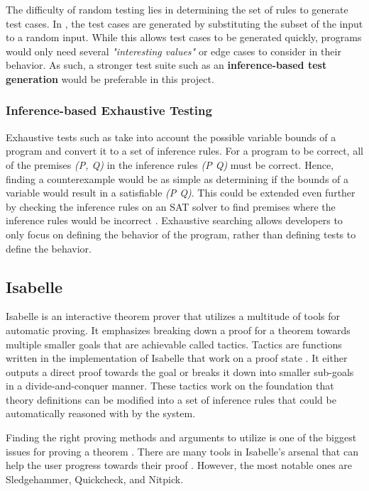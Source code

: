 The difficulty of random testing lies in determining the set of rules to generate test cases. In \cite{differentialTesting}, the test cases 
are generated by substituting the subset of the input to a random input. While this allows test cases to be generated quickly, programs would only 
need several \emph{"interesting values"} or edge cases to consider in their behavior. As such, a stronger test suite such as an 
\textbf{inference-based test generation} would be preferable in this project.

\subsubsection{Inference-based Exhaustive Testing}
\label{sec:inferenceTesting}

Exhaustive tests such as \cite{isabelleQuickcheck} take into account the possible variable bounds of a program and convert it to a set of 
inference rules. For a program to be correct, all of the premises \emph{(P, Q)} in the inference rules \emph{(P \rightarrow Q)} must be correct. Hence, 
finding a counterexample would be as simple as determining if the bounds of a variable would result in a satisfiable \emph{\lnot(P \rightarrow Q)}. 
This could be extended even further by checking the inference rules on an SAT solver to find premises where the inference rules would be incorrect 
\cite[Ch. 5]{isabelleProof}. Exhaustive searching allows developers to only focus on defining the behavior of the program, rather than defining 
tests to define the behavior.

\subsection{Isabelle}
\label{sec:Isabelle}

Isabelle is an interactive theorem prover that utilizes a multitude of tools for automatic proving. It emphasizes breaking down a proof 
for a theorem towards multiple smaller goals that are achievable called tactics. Tactics are functions written in the implementation of Isabelle 
that work on a proof state \cite{isabelleProof}. It either outputs a direct proof towards the goal or breaks it down into smaller sub-goals 
in a divide-and-conquer manner. These tactics work on the foundation that theory definitions can be modified into a set of inference rules that 
could be automatically reasoned with by the system.

Finding the right proving methods and arguments to utilize is one of the biggest issues for proving a theorem \cite{isabelleProof}. There are 
many tools in Isabelle's arsenal that can help the user progress towards their proof \cite{IsabelleHOL}. However, the most notable ones are 
Sledgehammer, Quickcheck, and Nitpick.

